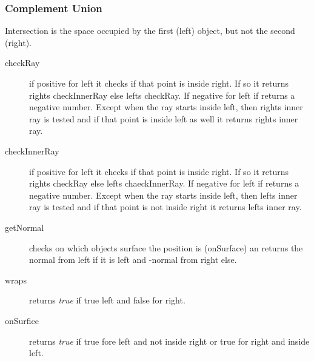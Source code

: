 		\subsubsection{Complement Union}
		
			Intersection is the space occupied by the first (left) object, but not the second (right).

			\begin{description}
				\item[checkRay] if positive for left it checks if that point is inside right. If so it returns rights checkInnerRay else lefts checkRay. If negative for left if returns a negative number. Except when the ray starts inside left, then rights inner ray is tested and if that point is inside left as well it returns rights inner ray.
				\item[checkInnerRay] if positive for left it checks if that point is inside right. If so it returns rights checkRay else lefts chaeckInnerRay. If negative for left if returns a negative number. Except when the ray starts inside left, then lefts inner ray is tested and if that point is not inside right it returns lefts inner ray.
				\item[getNormal] checks on which objects surface the position is (onSurface) an returns the normal from left if it is left and -normal from right else.
				\item[wraps] returns \emph{true} if true left and false for right.
				\item[onSurfice] returns \emph{true} if true fore left and not inside right or true for right and inside left.
			\end{description}